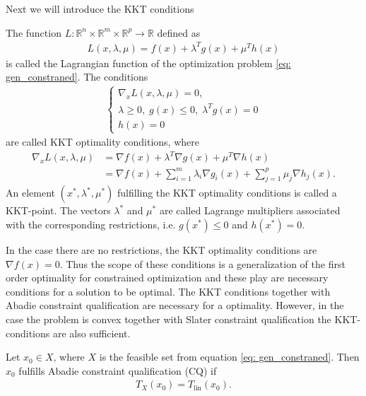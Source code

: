 Next we will introduce the KKT conditions
\begin{definition}
    \label{def: KKT}
    The function $L: \mathbb{R}^{n} \times \mathbb{R}^{m} \times
    \mathbb{R}^{p} \to \mathbb{R}$ defined as
    \begin{align}
        L(x, \lambda, \mu)= f(x) + \lambda^{T} g(x) + \mu^{T} h(x)
    \end{align}
    is called the Lagrangian function of the optimization problem
    \ref{eq: gen_constraned}. The conditions
    \begin{align}
        \begin{cases}
            \nabla_x L(x, \lambda, \mu) = 0,\\
            \lambda \ge 0,\; g(x) \le 0,\; \lambda^{T} g(x) = 0\\
            h(x) = 0
        \end{cases}
    \end{align}
    are called KKT optimality conditions, where
    \begin{align}
        \nabla_x L(x, \lambda, \mu) &= \nabla f(x) + \lambda^{T} \nabla
            g(x) +\mu^{T} \nabla h(x)\\
        &= \nabla f(x) + \sum_{i=1}^{m} \lambda_i \nabla g_i(x)
            + \sum_{j=1}^{p} \mu_j \nabla h_j(x).
    \end{align}
    An element $(x^{*}, \lambda^{*}, \mu^{*})$ fulfilling  the KKT optimality conditions is called a KKT-point. The vectors $\lambda^{*}$ and $\mu^{*}$ are
    called Lagrange multipliers associated with the corresponding restrictions,
    i.e. $g(x^{*}) \le 0$ and $h(x^{*}) = 0$.
\end{definition}
In the case there are no restrictions, the KKT optimality conditions are
$\nabla f(x) = 0$. Thus the scope of these conditions is a generalization of
the first order optimality for constrained optimization and these play are
necessary conditions for a solution to be optimal. The KKT conditions
together with Abadie constraint qualification are necessary for a optimality.
However, in the case the problem is convex together with Slater constraint
qualification the KKT-conditions are also sufficient.
\begin{definition}
    Let $x_0 \in X$, where $X$ is the feasible set from equation
    \ref{eq: gen_constraned}. Then $x_0$ fulfills Abadie constraint
    qualification (CQ) if
    \begin{align}
        T_X(x_0) = T_{\text{lin}}(x_0).
    \end{align}
\end{definition}
